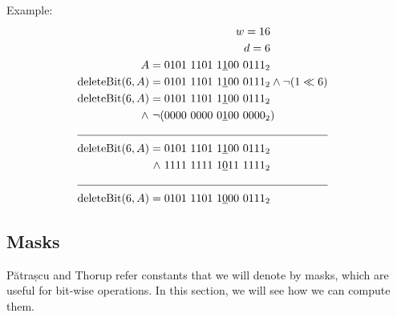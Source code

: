 Example:
\begin{align*}
    w = 16\\
    d = 6\\
    A = 0101\ 1101\ 1\underline{1}00\ 0111_2& \\
    \text{deleteBit}(6,A) = 0101\ 1101\ 1\underline{1}00\ 0111_2& \wedge \neg(1 \ll 6) \\
    \text{deleteBit}(6,A) = 0101\ 1101\ 1\underline{1}00\ 0111_2&\\
    \wedge\ \neg(0000\ 0000\ 0\underline{1}00\ 0000_2&) \\
    \cline{1-2}
    \text{deleteBit}(6,A) = 0101\ 1101\ 1\underline{1}00\ 0111_2& \\
    \wedge\ 1111\ 1111\ 1\underline{0}11\ 1111_2 \\
    \cline{1-2}
    \text{deleteBit}(6,A) = 0101\ 1101\ 1\underline{0}00\ 0111_2&
\end{align*}

\subsection{Masks} \label{sec:masks}

Pătrașcu and Thorup refer constants that we will denote by masks, which are useful for bit-wise operations. In this section, we will see how we can compute them.

